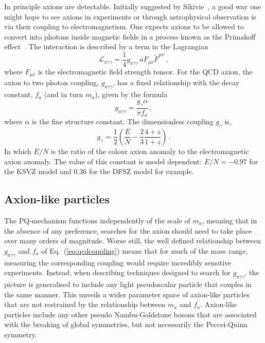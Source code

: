 In principle axions are detectable. Initially suggested by Sikivie~\cite{Sikivie:1983ip}, a good way one might hope to see axions in experiments or through astrophysical observation is via their coupling to electromagnetism. One expects axions to be allowed to convert into photons inside magnetic fields in a process known as the Primakoff effect~\cite{Pirmakoff:1951pj}. The interaction is described by a term in the Lagrangian
\begin{equation}\label{eq:interationlagrangian}
 \mathcal{L}_{a\gamma\gamma} = \frac{1}{4} g_{a\gamma\gamma}\, a F_{\mu \nu}\tilde{F}^{\mu \nu} \, ,
\end{equation}
where $F_{\mu \nu}$ is the electromagnetic field strength tensor. For the QCD axion, the axion to two photon coupling, $g_{a\gamma\gamma}$, has a fixed relationship with the decay constant, $f_a$ (and in turn $m_a$), given by the formula
\begin{equation}\label{eq:qcdcoupling}
 g_{a\gamma\gamma} = \frac{g_\gamma \alpha}{\pi f_a} \, ,
\end{equation}
where $\alpha$ is the fine structure constant. The dimensionless coupling $g_\gamma$ is,
\begin{equation}
 g_\gamma = \frac{1}{2}\left(\frac{E}{N} - \frac{2}{3}\frac{4+z}{1+z}\right) \, .
\end{equation}
In which  $E/N$ is the ratio of the colour axion anomaly to the electromagnetic axion anomaly. The value of this constant is model dependent: $E/N=-0.97$ for the KSVZ model and $0.36$ for the DFSZ model for example.

\subsection{Axion-like particles}\label{sec:axions_alps}
The PQ-mechanism functions independently of the scale of $m_a$, meaning that in the absence of any preference, searches for the axion should need to take place over many orders of magnitude. Worse still, the well defined relationship between $g_{a\gamma\gamma}$ and $f_a$ of Eq.~(\ref{eq:qcdcoupling}) means that for much of the mass range, measuring the corresponding coupling would require incredibly sensitive experiments. Instead, when describing techniques designed to search for $g_{a\gamma\gamma}$, the picture is generalised to include any light pseudoscalar particle that couples in the same manner. This unveils a wider parameter space of axion-like particles that are not restrained by the relationship between $m_a$ and $f_a$. Axion-like particles include any other pseudo Nambu-Goldstone bosons that are associated with the breaking of global symmetries, but not necessarily the Peccei-Quinn symmetry.

